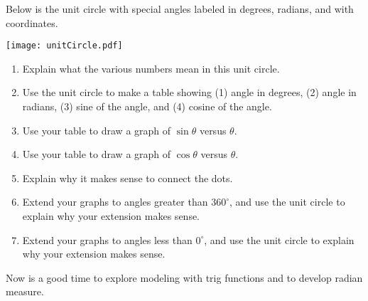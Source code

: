 \documentclass[nooutcomes]{ximera}
\begin{document}
\begin{problem}
Below is the unit circle with special angles labeled in degrees, radians, and with 
coordinates.
\begin{image}
\texttt{[image: unitCircle.pdf]}
\end{image}
\begin{enumerate}
\item Explain what the various numbers mean in this unit circle.  
\item Use the unit circle to make a table showing (1) angle in degrees, (2) angle in radians, (3) sine of the angle, and (4) cosine of the angle.  
\item Use your table to draw a graph of $\sin\theta$ versus $\theta$.
\item Use your table to draw a graph of $\cos\theta$ versus $\theta$.
\item Explain why it makes sense to connect the dots. 
\item Extend your graphs to angles greater than $360^\circ$, and use the unit circle to explain why your extension makes sense. 
\item Extend your graphs to angles less than $0^\circ$, and use the unit circle to explain why your extension makes sense.
\end{enumerate}
\end{problem}

\begin{teachingnote}
Now is a good time to explore modeling with trig functions and to develop radian measure.  
\end{teachingnote}

%
%
%
\end{document}
